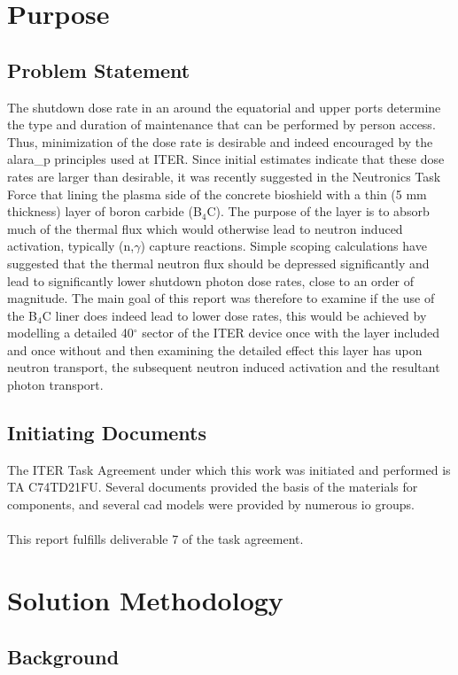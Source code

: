 \documentclass[12pt]{article}
\begin{document}
\newpage
\clearpage
\section{Purpose}
\subsection{Problem Statement}
The shutdown dose rate in an around the equatorial and upper ports determine the
type and duration of maintenance that can be performed by person access. Thus,
minimization of the dose rate is desirable and indeed encouraged by the 
\gls{alara_p} principles used at ITER. Since initial estimates indicate that
these dose rates are larger than desirable, it was recently suggested in the 
Neutronics Task Force that lining the plasma side of the concrete bioshield 
with a thin (5 mm thickness) layer of boron carbide (B$_4$C). The purpose 
of the layer is to absorb much of the thermal flux which would otherwise lead 
to neutron induced activation, typically (n,$\gamma$) capture reactions. Simple 
scoping calculations have suggested that the thermal neutron flux should be 
depressed significantly and lead to significantly lower shutdown photon dose 
rates, close to an order of magnitude. The main goal of this report was 
therefore to examine if the use of the B$_4$C liner does indeed lead to lower 
dose rates, this would be achieved by modelling a detailed 40$^{\circ}$ sector 
of the ITER device once with the layer included and once without and then 
examining the detailed effect this layer has upon neutron transport, the 
subsequent neutron induced activation and the resultant photon transport.

\subsection{Initiating Documents}
The ITER Task Agreement under which this work was initiated and performed is TA
C74TD21FU. Several documents provided the basis of the materials for components,
and several \gls{cad} models were provided by numerous \gls{io} groups.
\\
\\
This report fulfills deliverable 7 of the task agreement.

\newpage
\section{Solution Methodology}
\subsection{Background}
\end{document}
